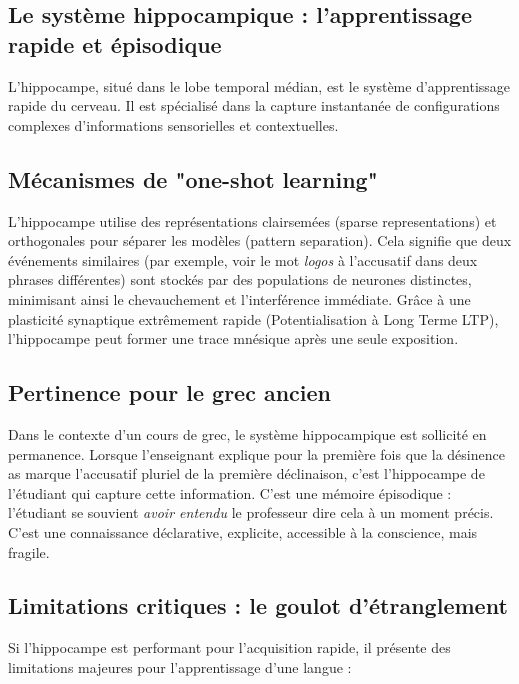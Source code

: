 \subsection{Le système hippocampique : l'apprentissage rapide et épisodique}

L'hippocampe, situé dans le lobe temporal médian, est le système d'apprentissage rapide du cerveau.
Il est spécialisé dans la capture instantanée de configurations complexes d'informations
sensorielles et contextuelles.



\subsection{Mécanismes de "one-shot learning"}

L'hippocampe utilise des représentations clairsemées (sparse representations) et orthogonales pour
séparer les modèles (pattern separation). Cela signifie que deux événements similaires (par exemple,
voir le mot \textit{logos} à l'accusatif dans deux phrases différentes) sont stockés par des
populations de neurones distinctes, minimisant ainsi le chevauchement et l'interférence immédiate.
Grâce à une plasticité synaptique extrêmement rapide (Potentialisation à Long Terme \- LTP),
l'hippocampe peut former une trace mnésique après une seule exposition.\cite{III-3-1-ref1}



\subsection{Pertinence pour le grec ancien}

Dans le contexte d'un cours de grec, le système hippocampique est sollicité en permanence. Lorsque
l'enseignant explique pour la première fois que \og la désinence \-as marque l'accusatif pluriel de
la première déclinaison\fg{}, c'est l'hippocampe de l'étudiant qui capture cette information. C'est
une mémoire épisodique : l'étudiant se souvient \textit{avoir entendu} le professeur dire cela à un
moment précis. C'est une connaissance déclarative, explicite, accessible à la conscience, mais
fragile.



\subsection{Limitations critiques : le goulot d'étranglement}

Si l'hippocampe est performant pour l'acquisition rapide, il présente des limitations majeures pour
l'apprentissage d'une langue :

